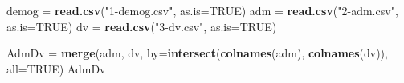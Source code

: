 \documentclass[10pt,]{krantz}
\makeatletter
\newenvironment{Shaded}{\begin{snugshade}}{\end{snugshade}}
\newcommand{\KeywordTok}[1]{\textcolor[rgb]{0.13,0.29,0.53}{\textbf{#1}}}
\newcommand{\DataTypeTok}[1]{\textcolor[rgb]{0.13,0.29,0.53}{#1}}
\newcommand{\StringTok}[1]{\textcolor[rgb]{0.31,0.60,0.02}{#1}}
\newcommand{\OtherTok}[1]{\textcolor[rgb]{0.56,0.35,0.01}{#1}}
\newcommand{\NormalTok}[1]{#1}
\newenvironment{kframe}{%
\medskip{}
\setlength{\fboxsep}{.8em}
 \def\at@end@of@kframe{}%
 \ifinner\ifhmode%
  \def\at@end@of@kframe{\end{minipage}}%
  \begin{minipage}{\columnwidth}%
 \fi\fi%
 \def\FrameCommand##1{\hskip\@totalleftmargin \hskip-\fboxsep
 \colorbox{shadecolor}{##1}\hskip-\fboxsep
     \hskip-\linewidth \hskip-\@totalleftmargin \hskip\columnwidth}%
 \MakeFramed {\advance\hsize-\width
   \@totalleftmargin\z@ \linewidth\hsize
   \@setminipage}}%
 {\par\unskip\endMakeFramed%
 \at@end@of@kframe}
\renewenvironment{Shaded}{\begin{kframe}}{\end{kframe}}
\makeatother
\begin{document}
\begin{Shaded}
\begin{Highlighting}[]
\NormalTok{demog =}\StringTok{ }\KeywordTok{read.csv}\NormalTok{(}\StringTok{"1-demog.csv"}\NormalTok{, }\DataTypeTok{as.is=}\OtherTok{TRUE}\NormalTok{)}
\NormalTok{adm =}\StringTok{ }\KeywordTok{read.csv}\NormalTok{(}\StringTok{"2-adm.csv"}\NormalTok{, }\DataTypeTok{as.is=}\OtherTok{TRUE}\NormalTok{)}
\NormalTok{dv =}\StringTok{ }\KeywordTok{read.csv}\NormalTok{(}\StringTok{"3-dv.csv"}\NormalTok{, }\DataTypeTok{as.is=}\OtherTok{TRUE}\NormalTok{)}

\NormalTok{AdmDv =}\StringTok{ }\KeywordTok{merge}\NormalTok{(adm, dv, }\DataTypeTok{by=}\KeywordTok{intersect}\NormalTok{(}\KeywordTok{colnames}\NormalTok{(adm), }\KeywordTok{colnames}\NormalTok{(dv)), }\DataTypeTok{all=}\OtherTok{TRUE}\NormalTok{)}
\NormalTok{AdmDv}
\end{Highlighting}
\end{Shaded}
\end{document}
